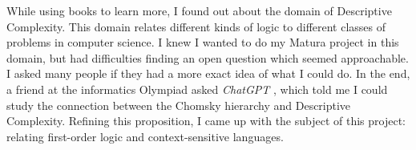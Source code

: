 While using books to learn more, I found out about the domain of Descriptive Complexity.
This domain relates different kinds of logic to different classes of problems in computer science.
I knew I wanted to do my Matura project in this domain, but had difficulties finding an open question which seemed approachable.
I asked many people if they had a more exact idea of what I could do.
In the end, a friend at the informatics Olympiad asked \emph{ChatGPT} \cite{chatgpt}, which told me I could study the connection between the Chomsky hierarchy and Descriptive Complexity.
Refining this proposition, I came up with the subject of this project: relating first-order logic and context-sensitive languages.



